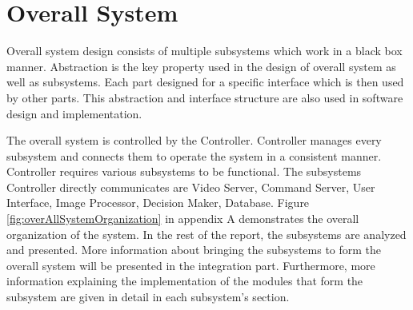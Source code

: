 \section{Overall System} \label{sec:overall_system}
Overall system design consists of multiple subsystems which work in a black box manner. Abstraction is the key property used in the design of overall system as well as subsystems. Each part designed for a specific interface which is then used by other parts. This abstraction and interface structure are also used in software design and implementation. 

The overall system is controlled by the Controller. Controller manages every subsystem and connects them to operate the system in a consistent manner. Controller requires various subsystems to be functional. The subsystems Controller directly communicates are Video Server, Command Server, User Interface, Image Processor, Decision Maker, Database. Figure \ref{fig:overAllSystemOrganization} in appendix A demonstrates the overall organization of the system. In the rest of the report, the subsystems are analyzed and presented. More information about bringing the subsystems to form the overall system will be presented in the integration part. Furthermore, more information explaining the implementation of the modules that form the subsystem are given in detail in each subsystem's section.

